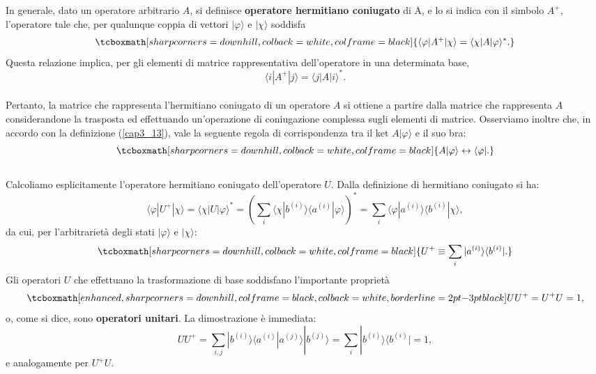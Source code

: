 In generale, dato un operatore arbitrario $A$, si definisce \textbf{operatore hermitiano coniugato} di A, e lo si indica con il simbolo $A^+$, l'operatore tale che, per qualunque coppia di vettori $| \varphi \rangle$ e $ | \chi \rangle $ soddisfa
	\begin{equation}
		\tcboxmath[sharp corners=downhill, colback=white, colframe=black]{
			\langle \varphi | A^{+} | \chi \rangle = \langle \chi | A | \varphi \rangle ^* .
			}
	\label{cap3_13}
	\end{equation}
Questa relazione implica, per gli elementi di matrice rappresentativa dell'operatore in una determinata base,
	\begin{equation}
		\langle i | A^{+} | j \rangle = \langle j | A | i \rangle ^* .
	\end{equation}\\

Pertanto, la matrice che rappresenta l'hermitiano coniugato di un operatore $A$ si ottiene a partire dalla matrice che rappresenta $A$ considerandone la trasposta ed effettuando un'operazione di coniugazione complessa sugli elementi di matrice. Osserviamo inoltre che, in accordo con la definizione (\ref{cap3_13}), vale la seguente regola di corrispondenza tra il ket $A| \varphi \rangle$ e il suo bra:
	\begin{equation}
		\tcboxmath[sharp corners=downhill, colback=white, colframe=black]{
			A| \varphi \rangle \leftrightarrow \langle \varphi | .
			}
	\end{equation}\\

Calcoliamo esplicitamente l'operatore hermitiano coniugato dell'operatore $U$. Dalla definizione di hermitiano coniugato si ha:
	\begin{equation}
		\langle \varphi | U^{+} | \chi \rangle = \langle \chi | U | \varphi \rangle ^* =  \left( \sum \limits_{i} \langle \chi | b^{(i)} \rangle \langle a^{(i)} | \varphi \rangle \right)^* =\sum \limits_{i} \langle \varphi | a^{(i)}\rangle \langle b^{(i)} | \chi \rangle ,
	\end{equation}
da cui, per l'arbitrarietà degli stati $| \varphi \rangle $ e $| \chi \rangle $:
	\begin{equation}
		\tcboxmath[sharp corners=downhill, colback=white, colframe=black]{
			U^+ \equiv \sum \limits_{i} | a^{(i)} \rangle \langle b^{(i)} |  .
			}
	\end{equation}
Gli operatori $U$ che effettuano la trasformazione di base soddisfano l'importante proprietà
	\begin{equation}
		\tcboxmath[enhanced, sharp corners=downhill, colframe=black, colback=white, borderline={2pt}{-3pt}{black}]{
			UU^+= U^+U=1 ,
			}
	\end{equation}
o, come si dice, sono \textbf{operatori unitari}. La dimostrazione è immediata:
	\begin{equation}
		UU^+ = \sum\limits_{i,j}  | b^{(i)} \rangle \langle a^{(i)} | a^{(j)} \rangle | b^{(j)} \rangle = 
\sum\limits_{i} | b^{(i)} \rangle \langle b^{(i)} | = 1 ,
	\end{equation}
e analogamente per $U^+U$.\\

